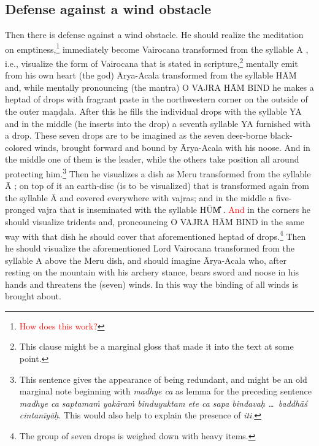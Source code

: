 \documentclass[11pt]{book}
\makeatletter
\def\fakesc#1{%
  \begingroup%
  \xdef\fake@name{\csname\curr@fontshape/\f@size\endcsname}%
  \fontsize{1.3\fontdimen8\fake@name}{\baselineskip}\selectfont%
  \uppercase{#1}%
  \endgroup%
}
\newcommand{\mantra}[1]{\fakesc{#1}}
\newcommand{\red}[1]{\textcolor{red}{#1}}
\newcommand{\skt}[1]{\emph{#1}}
\makeatother
\begin{document}
\subsection{Defense against a wind obstacle}
Then there is defense against a wind obstacle. He should realize the meditation on emptiness,\footnote{\red{How does this work?}} immediately become Vairocana transformed from the syllable \mantra{a}, i.e., visualize the form of Vairocana that is stated in scripture,\footnote{This clause might be a marginal gloss that made it into the text at some point.} mentally emit from his own heart (the god) Ārya-Acala transformed from the syllable \mantra{hāṁ} and, while mentally pronouncing (the mantra) \mantra{o vajra hāṁ bind} he makes a heptad of drops with fragrant paste in the northwestern corner on the outside of the outer maṇḍala. After this he fills the individual drops with the syllable \mantra{ya} and in the middle (he inserts into the drop) a seventh syllable \mantra{ya} furnished with a drop. These seven drops are to be imagined as the seven deer-borne black-colored winds, brought forward and bound by Ārya-Acala with his noose. And in the middle one of them is the leader, while the others take position all around protecting him.\footnote{This sentence gives the appearance of being redundant, and might be an old marginal note beginning with \skt{madhye ca} as lemma for the preceding sentence \skt{madhye ca saptamaṁ yakāraṁ binduyuktam ete ca sapa bindavaḥ \ldots\ baddhāś cintanīyāḥ}. This would also help to explain the presence of \skt{iti}.} Then he visualizes a dish as Meru transformed from the syllable \mantra{ā}; on top of it an earth-disc (is to be visualized) that is transformed again from the syllable \mantra{ā} and covered everywhere with vajras; and in the middle a five-pronged vajra that is inseminated with the syllable \mantra{hūm̐}. \red{And} in the corners he should visualize tridents and, proncouncing \mantra{o vajra hāṁ bind} in the same way with that dish he should cover that aforementioned heptad of drops.\footnote{The group of seven drops is weighed down with heavy items.} Then he should visualize the aforementioned Lord Vairocana transformed from the syllable \mantra{a} above the Meru dish, and should imagine Ārya-Acala who, after resting on the mountain with his archery stance, bears sword and noose in his hands and threatens the (seven) winds. In this way the binding of all winds is brought about.
\end{document}
